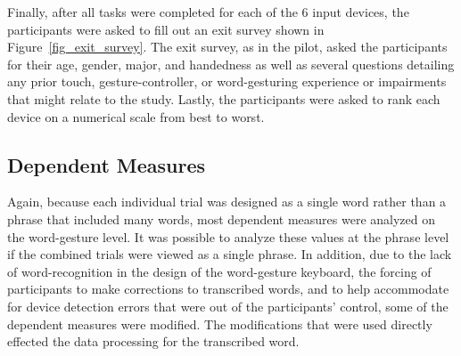Finally, after all tasks were completed for each of the 6 input devices, the participants were asked to fill out an exit survey shown in Figure~\ref{fig_exit_survey}. The exit survey, as in the pilot, asked the participants for their age, gender, major, and handedness as well as several questions detailing any prior touch, gesture-controller, or word-gesturing experience or impairments that might relate to the study. Lastly, the participants were asked to rank each device on a numerical scale from best to worst.

\begin{table}[h] %
	\centering
	\caption[Final Study Schedule of Assessments]{\centering Schedule of Assessments for a single study visit (in minutes).}
	\label{final_schedule_of_assessments}
\end{table}

\subsection{Dependent Measures} \label{final_dependent_measures}
Again, because each individual trial was designed as a single word rather than a phrase that included many words, most dependent measures were analyzed on the word-gesture level. It was possible to analyze these values at the phrase level if the combined trials were viewed as a single phrase. In addition, due to the lack of word-recognition in the design of the word-gesture keyboard, the forcing of participants to make corrections to transcribed words, and to help accommodate for device detection errors that were out of the participants' control, some of the dependent measures were modified. The modifications that were used directly effected the data processing for the transcribed word.

